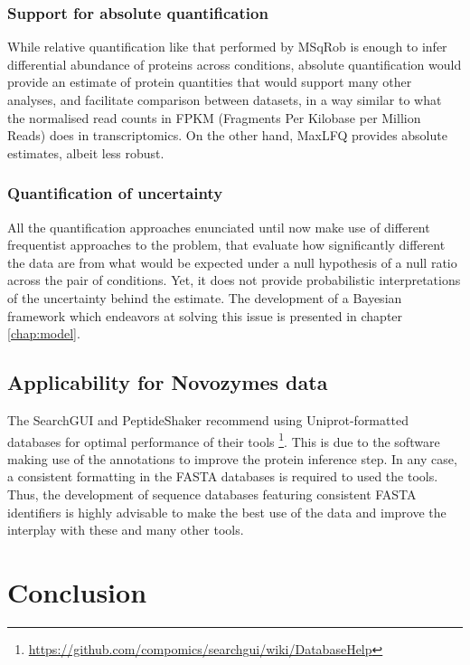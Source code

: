 \subsubsection{Support for absolute quantification}

While relative quantification like that performed by MSqRob is enough to infer differential abundance of proteins across conditions, absolute quantification would provide an estimate of protein quantities that would support many other analyses, and facilitate comparison between datasets, in a way similar to what the normalised read counts in FPKM (Fragments Per Kilobase per Million Reads) does in transcriptomics. On the other hand, MaxLFQ provides absolute estimates, albeit less robust.

\subsubsection{Quantification of uncertainty}

All the quantification approaches enunciated until now make use of different frequentist approaches to the problem, that evaluate how significantly different the data are from what would be expected under a null hypothesis of a null ratio across the pair of conditions. Yet, it does not provide probabilistic interpretations of the uncertainty behind the estimate. The development of a Bayesian framework which endeavors at solving this issue is presented in chapter \ref{chap:model}.

\subsection{Applicability for Novozymes data}

The SearchGUI and PeptideShaker recommend using Uniprot-formatted databases for optimal performance of their tools \footnote{\href{https://github.com/compomics/searchgui/wiki/DatabaseHelp}{https://github.com/compomics/searchgui/wiki/DatabaseHelp}}. This is due to the software making use of the annotations to improve the protein inference step. In any case, a consistent formatting in the FASTA databases is required to used the tools. Thus, the development of sequence databases featuring consistent FASTA identifiers is highly advisable to make the best use of the data and improve the interplay with these and many other tools.


\section{Conclusion}

